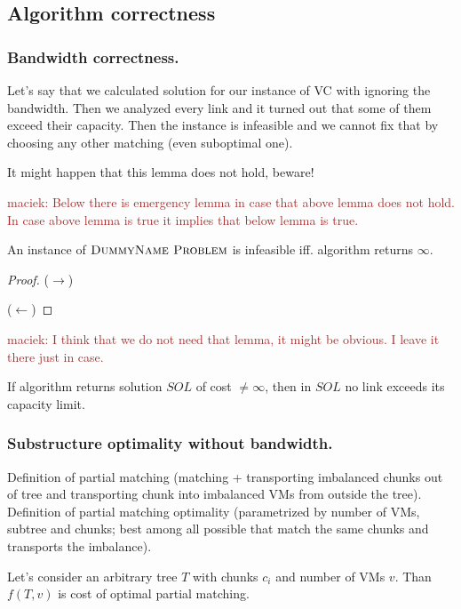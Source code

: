 \documentclass[9pt,twocolumn]{scrartcl}
\newcommand{\Problem}{\textsc{DummyName Problem}}
\newcommand{\maciek}[1]{\textcolor{brown}{maciek: #1}}
\newcommand{\Sol}{\ensuremath{SOL}}
\begin{document}
\subsection{Algorithm correctness}

\subsubsection{Bandwidth correctness.}

\begin{lemma}
Let's say that we calculated solution for our instance of VC with
ignoring the bandwidth. Then we analyzed every link and it turned out
that some of them exceed their capacity. Then the instance is
infeasible and we cannot fix that by choosing any other matching (even
suboptimal one).
\end{lemma}

It might happen that this lemma does not hold, beware!

\maciek{Below there is emergency lemma in case that above lemma does not hold. In case above lemma is true it implies that below lemma is true.}
\begin{lemma}
An instance of $\Problem$ is infeasible iff. algorithm returns
$\infty$.
\end{lemma}
\begin{proof}
  ($\rightarrow$)

  ($\leftarrow$) \end{proof}

\maciek{I think that we do not need that lemma, it might be obvious. I leave it there just in case.}
\begin{lemma}
  If algorithm returns solution $\Sol$ of cost $\neq \infty$, then in
  $\Sol$ no link exceeds its capacity limit.  \end{lemma}

\subsubsection{Substructure optimality without bandwidth.}

Definition of partial matching (matching + transporting imbalanced
chunks out of tree and transporting chunk into imbalanced VMs from
outside the tree). Definition of partial matching optimality
(parametrized by number of VMs, subtree and chunks; best among all
possible that match the same chunks and transports the imbalance).
\begin{lemma}

Let's consider an arbitrary tree $T$ with chunks $c_i$ and number of
VMs $v$. Than $f(T, v)$ is cost of optimal partial matching.

\end{lemma}
\end{document}
